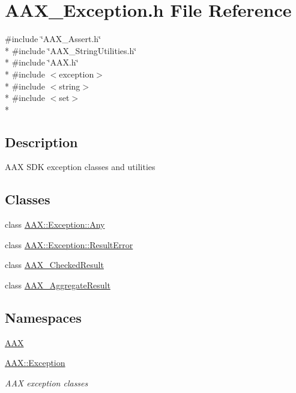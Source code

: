 \hypertarget{a00208}{}\section{A\+A\+X\+\_\+\+Exception.\+h File Reference}
\label{a00208}
{\ttfamily \#include \char`\"{}A\+A\+X\+\_\+\+Assert.\+h\char`\"{}}\\*
{\ttfamily \#include \char`\"{}A\+A\+X\+\_\+\+String\+Utilities.\+h\char`\"{}}\\*
{\ttfamily \#include \char`\"{}A\+A\+X.\+h\char`\"{}}\\*
{\ttfamily \#include $<$exception$>$}\\*
{\ttfamily \#include $<$string$>$}\\*
{\ttfamily \#include $<$set$>$}\\*


\subsection{Description}
A\+A\+X S\+D\+K exception classes and utilities 

\subsection*{Classes}
\begin{DoxyCompactItemize}
\item 
class \hyperlink{a00143}{A\+A\+X\+::\+Exception\+::\+Any}
\item 
class \hyperlink{a00147}{A\+A\+X\+::\+Exception\+::\+Result\+Error}
\item 
class \hyperlink{a00019}{A\+A\+X\+\_\+\+Checked\+Result}
\item 
class \hyperlink{a00009}{A\+A\+X\+\_\+\+Aggregate\+Result}
\end{DoxyCompactItemize}
\subsection*{Namespaces}
\begin{DoxyCompactItemize}
\item 
 \hyperlink{a00288}{A\+A\+X}
\item 
 \hyperlink{a00320}{A\+A\+X\+::\+Exception}
\begin{DoxyCompactList}\small\item\em A\+A\+X exception classes \end{DoxyCompactList}\end{DoxyCompactItemize}
